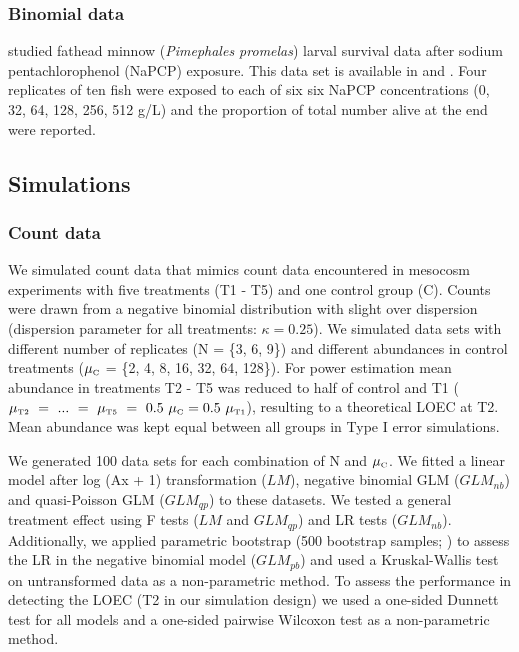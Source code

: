 \documentclass{scrartcl}
\begin{document}
\subsubsection{Binomial data}
\citet{weber_short-term_1989} studied fathead minnow (\textit{Pimephales promelas}) larval survival data after sodium pentachlorophenol (NaPCP) exposure.
This data set is available in \citet{newman_quantitative_2012} and \citet{epa_methods_2002}.
Four replicates of ten fish were exposed to each of six six NaPCP concentrations (0, 32, 64, 128, 256, 512 \textmu g/L) and the proportion of total number alive at the end were reported. 


\subsection{Simulations}
\subsubsection{Count data}
We simulated count data that mimics count data encountered in mesocosm experiments with five treatments (T1 - T5) and one control group (C).
Counts were drawn from a negative binomial distribution with slight over dispersion (dispersion parameter for all treatments: $\kappa = 0.25$).
We simulated data sets with different number of replicates (N = \{3, 6, 9\}) and different abundances in control treatments ($\mu_\text{\tiny C}$ = \{2, 4, 8, 16, 32, 64, 128\}). 
For power estimation mean abundance in treatments T2 - T5 was reduced to half of control and T1 ($\mu_\text{\tiny T2}~=~...~=~\mu_\text{\tiny T5}~=~0.5~\mu_\text{\tiny C} = 0.5~\mu_\text{\tiny T1}$), resulting to a theoretical LOEC at T2.
Mean abundance was kept equal between all groups in Type I error simulations.

We generated 100 data sets for each combination of N and $\mu_\text{\tiny C}$. 
We fitted a linear model after log (Ax + 1) transformation ($LM$), negative binomial GLM ($GLM_{nb}$) and quasi-Poisson GLM ($GLM_{qp}$) to these datasets. 
We tested a general treatment effect using F tests ($LM$ and $GLM_{qp}$) and LR tests ($GLM_{nb}$). Additionally, we applied parametric bootstrap (500 bootstrap samples; \citet{faraway_extending_2006}) to assess the LR in the negative binomial model ($GLM_{pb}$) and used a Kruskal-Wallis test on untransformed data as a non-parametric method.
To assess the performance in detecting the LOEC (T2 in our simulation design) we used a one-sided Dunnett test for all models and a one-sided pairwise Wilcoxon test as a non-parametric method.
\end{document}
